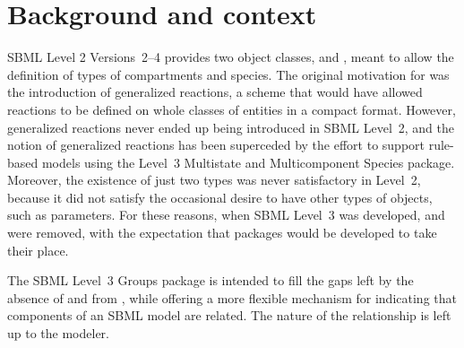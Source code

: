 
\section{Background and context}
\label{background}

SBML Level 2 Versions~2--4 provides two object classes, \CompartmentType and \SpeciesType, meant to allow the definition of types of compartments and species. The original motivation for  was the  introduction of  generalized reactions, a scheme that would have allowed reactions to be defined on whole classes of entities in a compact format. However, generalized reactions never ended up being introduced in SBML Level~2, and the notion of generalized reactions has been superceded by the effort to support rule-based models using the Level~3 Multistate and Multicomponent Species package.  Moreover, the existence of just two types was never satisfactory in Level~2, because it did not satisfy the occasional desire to have other types of objects, such as parameters.  For these reasons, when SBML Level~3 was developed, \CompartmentType and \SpeciesType were removed, with the expectation that  packages would be developed to take their place.

The SBML Level~3 Groups package is intended to fill the gaps left by the absence of \CompartmentType and \SpeciesType from \sbmlthreecore, while  offering a more flexible mechanism for indicating that components of an SBML model are related.  The nature of the relationship is left up to the modeler.  

